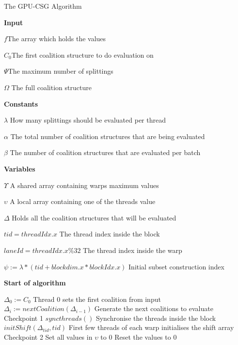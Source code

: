 \documentclass[a4paper, 12pt]{report}
\begin{document}
\begin{algorithm*}[!t]
\caption{The GPU-CSG Algorithm\label{gpudp}}
\textbf{Input}

$f$\hfill The array which holds the values

$C_0$\hfill The first coalition structure to do evaluation on

$\Psi$\hfill The maximum number of splittings

$\Omega$ \hfill The full coalition structure

\textbf{Constants}

$\lambda$ \hfill How many splittings should be evaluated per thread

$\alpha$ \hfill The total number of coalition structures that are being evaluated

$\beta$ \hfill The number of coalition structures that are evaluated per batch

\textbf{Variables} 

$\Upsilon$ \hfill A shared array containing warps maximum values

$\upsilon$ \hfill A local array containing one of the threads value

$\Delta$ \hfill Holds all the coalition structures that will be evaluated

$tid = threadIdx.x$ \hfill The thread index inside the block

$laneId = threadIdx.x \% 32$ \hfill The thread index inside the warp

$\psi := \lambda*(tid+blockdim.x*blockIdx.x)$ \hfill Initial subset construction index

\textbf{Start of algorithm}
\begin{algorithmic}[1]
  \STATE $\Delta_0 := C_0$ \hfill Thread 0 sets the first coalition from input
    \STATE $\Delta_i := nextCoalition(\Delta_{i-1})$ \hfill Generate the next coalitions to evaluate
  \ENDFOR \hfill Checkpoint 1
\ENDIF
\STATE $syncthreads()$ \hfill Synchronise the threads inside the block 
  \STATE $initShift(\Delta_{tid},tid)$ \hfill First few threads of each warp initialises the shift array
\ENDIF
\hfill Checkpoint 2
\label{lst:line:bigfetch}
  \STATE Set all values in $\upsilon$ to 0 \hfill Reset the values to 0


\end{algorithmic}
\end{algorithm*}
\end{document}
